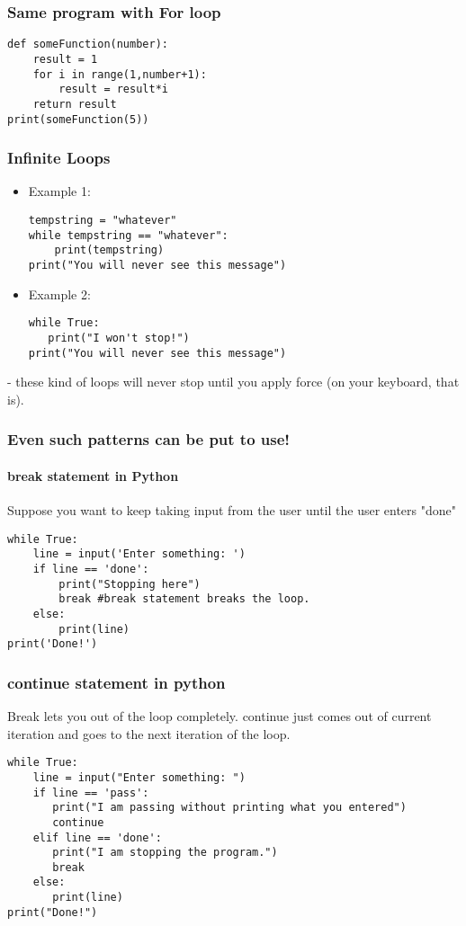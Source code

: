 \documentclass{beamer}
\begin{document}
\begin{frame}[fragile]
\frametitle{Same program with For loop}
\begin{verbatim}
def someFunction(number):
    result = 1
    for i in range(1,number+1):
        result = result*i
    return result
print(someFunction(5)) 
\end{verbatim} 
\end{frame}


\begin{frame}[fragile]
\frametitle{Infinite Loops}
\begin{itemize}
\item Example 1:
\begin{verbatim}
tempstring = "whatever"
while tempstring == "whatever":
    print(tempstring)
print("You will never see this message")
\end{verbatim}

\item Example 2:
\begin{verbatim}
while True:
   print("I won't stop!")
print("You will never see this message")
\end{verbatim}
\end{itemize} 
\bigskip - these kind of loops will never stop until you apply force (on your keyboard, that is).
\end{frame}

\begin{frame}[fragile]%
\frametitle{Even such patterns can be put to use!}
\framesubtitle{break statement in Python}
Suppose you want to keep taking input from the user until the user enters "done"
\begin{verbatim}
while True:
    line = input('Enter something: ')
    if line == 'done':
        print("Stopping here")
        break #break statement breaks the loop.
    else:
        print(line)
print('Done!')
\end{verbatim}
\end{frame}

\begin{frame}[fragile]
\frametitle{continue statement in python}
Break lets you out of the loop completely. continue just comes out of current iteration and goes to the next iteration of the loop.
\small \begin{verbatim}
while True:
    line = input("Enter something: ")
    if line == 'pass':
       print("I am passing without printing what you entered")
       continue 
    elif line == 'done':
       print("I am stopping the program.")
       break
    else:
       print(line)
print("Done!")
\end{verbatim}
\end{frame}
\end{document}
